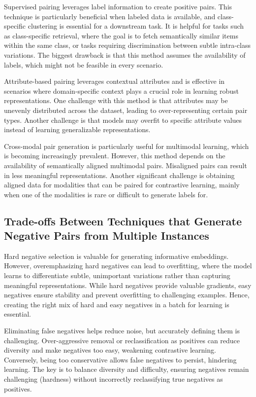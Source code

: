 Supervised pairing leverages label information to create positive pairs. This technique is particularly beneficial when labeled data is available, and class-specific clustering is essential for a downstream task. It is helpful for tasks such as class-specific retrieval, where the goal is to fetch semantically similar items within the same class, or tasks requiring discrimination between subtle intra-class variations. The biggest drawback is that this method assumes the availability of labels, which might not be feasible in every scenario.

Attribute-based pairing leverages contextual attributes and is effective in scenarios where domain-specific context plays a crucial role in learning robust representations. One challenge with this method is that attributes may be unevenly distributed across the dataset, leading to over-representing certain pair types. Another challenge is that models may overfit to specific attribute values instead of learning generalizable representations. %

Cross-modal pair generation is particularly useful for multimodal learning, which is becoming increasingly prevalent. However, this method depends on the availability of semantically aligned multimodal pairs. Misaligned pairs can result in less meaningful representations. Another significant challenge is obtaining aligned data for modalities that can be paired for contrastive learning, mainly when one of the modalities is rare or difficult to generate labels for.

\subsection{Trade-offs Between Techniques that Generate Negative Pairs from Multiple Instances}

Hard negative selection is valuable for generating informative embeddings. However, overemphasizing hard negatives can lead to overfitting, where the model learns to differentiate subtle, unimportant variations rather than capturing meaningful representations.  While hard negatives provide valuable gradients, easy negatives ensure stability and prevent overfitting to challenging examples. Hence, creating the right mix of hard and easy negatives in a batch for learning is essential.

Eliminating false negatives helps reduce noise, but accurately defining them is challenging. Over-aggressive removal or reclassification as positives can reduce diversity and make negatives too easy, weakening contrastive learning. Conversely, being too conservative allows false negatives to persist, hindering learning. The key is to balance diversity and difficulty, ensuring negatives remain challenging (hardness) without incorrectly reclassifying true negatives as positives. 


